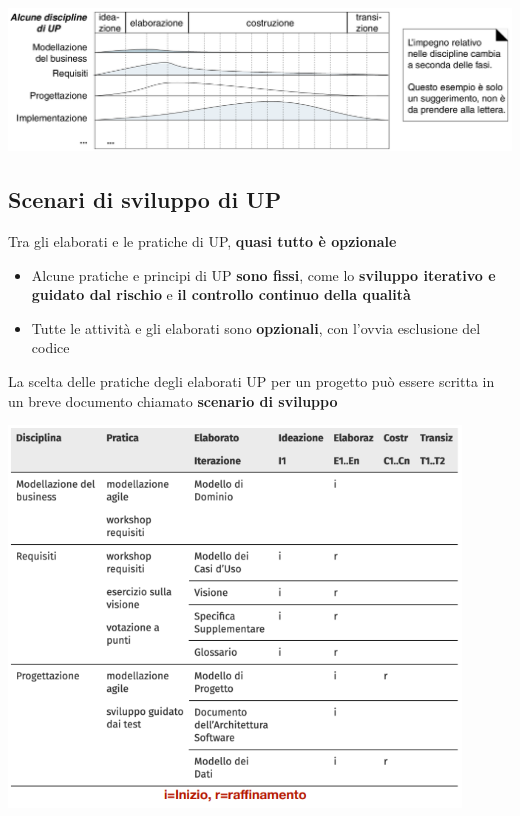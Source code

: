 \documentclass[12pt]{article}
\begin{document}
\begin{center}
    \includegraphics[width = 1\textwidth]{Images/21.png}
\end{center}
\subsection{Scenari di sviluppo di UP}
Tra gli elaborati e le pratiche di UP, \textbf{quasi tutto è opzionale}
\begin{itemize}
    \item Alcune pratiche e principi di UP \textbf{sono fissi}, come lo \textbf{sviluppo iterativo e guidato dal rischio} e \textbf{il controllo continuo della qualità}
    \item Tutte le attività e gli elaborati sono \textbf{opzionali}, con l'ovvia esclusione del codice
\end{itemize}
La scelta delle pratiche degli elaborati UP per un progetto può essere scritta in un breve documento chiamato \textbf{scenario di sviluppo}
\begin{center}
    \includegraphics[width = 0.90\textwidth]{Images/22.png}
\end{center}
\end{document}
